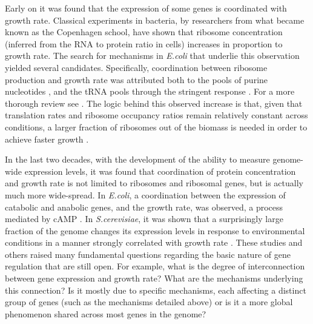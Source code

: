 \documentclass[notitlepage]{article}
\begin{document}
Early on it was found that the expression of some genes is coordinated with growth rate.
Classical experiments in bacteria, by researchers from what became known as the Copenhagen school, have shown that ribosome concentration (inferred from the RNA to protein ratio in cells) increases in proportion to growth rate\parencite{Schaechter1958}.
The search for mechanisms in \emph{E.coli} that underlie this observation yielded several candidates.
Specifically, coordination between ribosome production and growth rate was attributed both to the pools of purine nucleotides \parencite{Gourse1996,Gaal1997}, and the tRNA pools through the stringent response \parencite{Chatterji2001,Brauer2008a}.
For a more thorough review see \parencite{Nomura1984}.
The logic behind this observed increase is that, given that translation rates and ribosome occupancy ratios remain relatively constant across conditions, a larger fraction of ribosomes out of the biomass is needed in order to achieve faster growth \parencite{neidhardt1999a,dennis2004,Zaslaver2009}.

In the last two decades, with the development of the ability to measure genome-wide expression levels, it was found that coordination of protein concentration and growth rate is not limited to ribosomes and ribosomal genes, but is actually much more wide-spread.
In \emph{E.coli}, a coordination between the expression of catabolic and anabolic genes, and the growth rate, was observed, a process mediated by cAMP \parencite{Saldanha2004}.
In \emph{S.cerevisiae}, it was shown that a surprisingly large fraction of the genome changes its expression levels in response to environmental conditions in a manner strongly correlated with growth rate \parencite{Keren2013a,Gasch2000,Castrillo2007,Zaslaver2009, Berthoumieux2013, Gerosa2013}.
These studies and others raised many fundamental questions regarding the basic nature of gene regulation that are still open.
For example, what is the degree of interconnection between gene expression and growth rate? What are the mechanisms underlying this connection? Is it mostly due to specific mechanisms, each affecting a distinct group of genes (such as the mechanisms detailed above) or is it a more global phenomenon shared across most genes in the genome?
\end{document}
